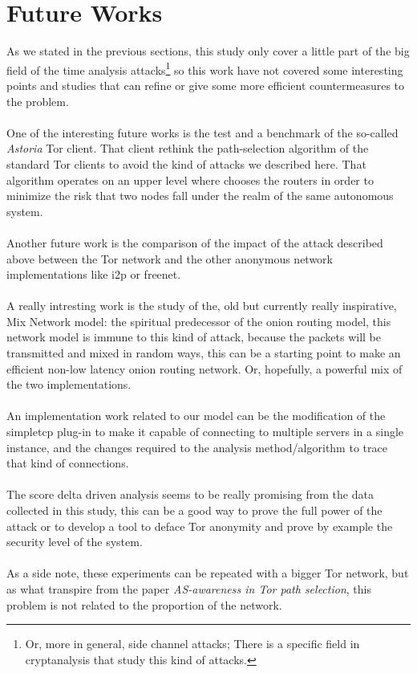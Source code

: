 \section{Future Works}
As we stated in the previous sections, this study only cover a little part of
the big field of the time analysis attacks\footnote{Or, more in general, side
channel attacks; There is a specific field in cryptanalysis that study this kind
of attacks.} so this work have not covered some interesting points and
studies that
can refine or give some more efficient countermeasures to the problem.
\\\\
One of the interesting future works is the test and a benchmark
of the so-called \emph{Astoria}\cite{starov2015measuring} Tor client.
That client rethink
the path-selection algorithm of the standard Tor clients to avoid the kind of
attacks we described here. That algorithm operates on an upper level
where chooses the routers in order to minimize the risk that two nodes fall under 
the realm of the same autonomous system.
\\\\
Another future work is the comparison of the impact of the attack described above
between the Tor network and the other anonymous network implementations like i2p or freenet.
\\\\
A really intresting work is the study of the, old but currently really inspirative,
Mix Network model\cite{chaum1981untraceable}: the spiritual predecessor
of the onion routing model, this network model is immune to this kind of
attack, because the packets will be transmitted and mixed in random ways,
this can be a starting point to make an efficient non-low latency onion routing
network. Or, hopefully, a powerful mix of the two implementations.
\\\\
An implementation work related to our model can be the modification
of the simpletcp plug-in to make it capable of connecting to
multiple servers in a single instance, and the changes
required to the analysis method/algorithm to trace that kind of connections.
\\\\
The score delta driven analysis seems to be really promising from the data collected
in this study, this can be a good way to prove the full power of the attack or
to develop a tool to deface Tor anonymity and prove by example the security 
level of the system.
\\\\
As a side note, these experiments can be repeated with a bigger Tor
network, but as what transpire from the paper \emph{AS-awareness in Tor
path selection}\cite{edman2009awareness}, this problem is not related to
the proportion of the network.
